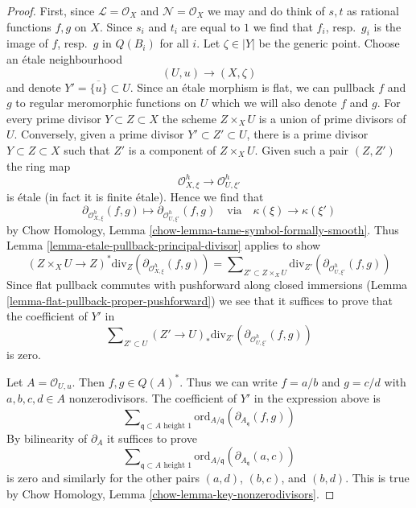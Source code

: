 \documentclass{stacks-project}
\theoremstyle{plain}
\theoremstyle{definition}
\theoremstyle{remark}
\numberwithin{equation}{subsection}
\begin{document}
\begin{proof}
\medskip\noindent
First, since $\mathcal{L} = \mathcal{O}_X$ and $\mathcal{N} = \mathcal{O}_X$
we may and do think of $s, t$ as rational functions $f, g$ on $X$.
Since $s_i$ and $t_i$ are equal to $1$ we find that $f_i$, resp.\ $g_i$
is the image of $f$, resp.\ $g$ in $Q(B_i)$ for all $i$.
Let $\zeta \in |Y|$ be the generic point. Choose an
\'etale neighbourhood
$$
(U, u) \longrightarrow (X, \zeta)
$$
and denote $Y' = \overline{\{u\}} \subset U$.
Since an \'etale morphism is flat, we can pullback $f$ and $g$
to regular meromorphic functions on $U$ which we will also denote
$f$ and $g$.
For every prime divisor $Y \subset Z \subset X$ the scheme $Z \times_X U$
is a union of prime divisors of $U$. Conversely, given a prime divisor
$Y' \subset Z' \subset U$, there is a prime divisor
$Y \subset Z \subset X$ such that $Z'$ is a component of $Z \times_X U$.
Given such a pair $(Z, Z')$ the ring map
$$
\mathcal{O}_{X, \xi}^h \to \mathcal{O}_{U, \xi'}^h
$$
is \'etale (in fact it is finite \'etale). Hence we find that
$$
\partial_{\mathcal{O}_{X, \xi}^h}(f, g) \mapsto
\partial_{\mathcal{O}_{U, \xi'}^h}(f, g)
\quad\text{via}\quad
\kappa(\xi) \to \kappa(\xi')
$$
by Chow Homology, Lemma \ref{chow-lemma-tame-symbol-formally-smooth}.
Thus Lemma \ref{lemma-etale-pullback-principal-divisor} applies to show
$$
(Z \times_X U \to Z)^*\text{div}_Z(\partial_{\mathcal{O}_{X, \xi}^h}(f, g))
=
\sum\nolimits_{Z' \subset Z \times_X U}
\text{div}_{Z'}(\partial_{\mathcal{O}_{U, \xi'}^h}(f, g))
$$
Since flat pullback commutes with pushforward along closed
immersions (Lemma \ref{lemma-flat-pullback-proper-pushforward})
we see that it suffices to prove that the coefficient
of $Y'$ in
$$
\sum\nolimits_{Z' \subset U} 
(Z' \to U)_*\text{div}_{Z'}(\partial_{\mathcal{O}_{U, \xi'}^h}(f, g))
$$
is zero.

\medskip\noindent
Let $A = \mathcal{O}_{U, u}$. Then $f, g \in Q(A)^*$.
Thus we can write $f = a/b$ and $g = c/d$ with
$a, b, c, d \in A$ nonzerodivisors.
The coefficient of $Y'$ in the expression above is
$$
\sum\nolimits_{\mathfrak q \subset A\text{ height }1}
\text{ord}_{A/\mathfrak q}(\partial_{A_\mathfrak q}(f, g))
$$
By bilinearity of $\partial_A$ it suffices to prove
$$
\sum\nolimits_{\mathfrak q \subset A\text{ height }1}
\text{ord}_{A/\mathfrak q}(\partial_{A_\mathfrak q}(a, c))
$$
is zero and similarly for the other pairs $(a, d)$, $(b, c)$, and
$(b, d)$. This is true by
Chow Homology, Lemma \ref{chow-lemma-key-nonzerodivisors}.
\end{proof}
\end{document}

